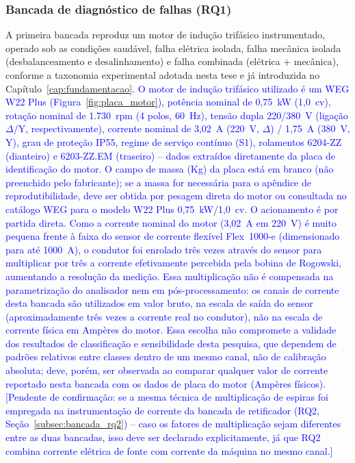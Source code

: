 \documentclass[times,final]{elsarticle}
\begin{document}
\subsubsection{Bancada de diagnóstico de falhas (RQ1)}
\label{subsec:bancada_rq1}
A primeira bancada reproduz um motor de indução trifásico instrumentado, operado sob as condições saudável, falha elétrica isolada, falha mecânica isolada (desbalanceamento e desalinhamento) e falha combinada (elétrica + mecânica), conforme a taxonomia experimental adotada nesta tese e já introduzida no Capítulo~\ref{cap:fundamentacao}. \textcolor{blue}{O motor de indução trifásico utilizado é um WEG W22 Plus (Figura~\ref{fig:placa_motor}), potência nominal de 0,75~kW (1,0~cv), rotação nominal de 1.730~rpm (4 polos, 60~Hz), tensão dupla 220/380~V (ligação $\Delta$/Y, respectivamente), corrente nominal de 3,02~A (220~V, $\Delta$) / 1,75~A (380~V, Y), grau de proteção IP55, regime de serviço contínuo (S1), rolamentos 6204-ZZ (dianteiro) e 6203-ZZ.EM (traseiro) -- dados extraídos diretamente da placa de identificação do motor. \textcolor{blue}{O campo de massa (Kg) da placa está em branco (não preenchido pelo fabricante); se a massa for necessária para o apêndice de reprodutibilidade, deve ser obtida por pesagem direta do motor ou consultada no catálogo WEG para o modelo W22 Plus 0,75~kW/1,0~cv. O acionamento é por partida direta. Como a corrente nominal do motor (3,02~A em 220~V) é muito pequena frente à faixa do sensor de corrente flexível Flex~1000-e (dimensionado para até 1000~A), o condutor foi enrolado três vezes através do sensor para multiplicar por três a corrente efetivamente percebida pela bobina de Rogowski, aumentando a resolução da medição. Essa multiplicação não é compensada na parametrização do analisador nem em pós-processamento: os canais de corrente desta bancada são utilizados em valor bruto, na escala de saída do sensor (aproximadamente três vezes a corrente real no condutor), não na escala de corrente física em Ampères do motor. Essa escolha não compromete a validade dos resultados de classificação e sensibilidade desta pesquisa, que dependem de padrões relativos entre classes dentro de um mesmo canal, não de calibração absoluta; deve, porém, ser observada ao comparar qualquer valor de corrente reportado nesta bancada com os dados de placa do motor (Ampères físicos). [Pendente de confirmação: se a mesma técnica de multiplicação de espiras foi empregada na instrumentação de corrente da bancada de retificador (RQ2, Seção~\ref{subsec:bancada_rq2}) -- caso os fatores de multiplicação sejam diferentes entre as duas bancadas, isso deve ser declarado explicitamente, já que RQ2 combina corrente elétrica de fonte com corrente da máquina no mesmo canal.]}}
\end{document}

